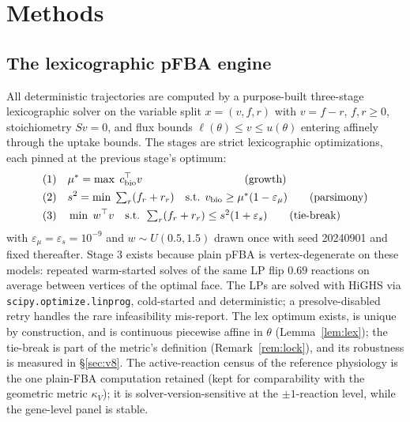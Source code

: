 \documentclass[11pt,a4paper]{article}
\theoremstyle{plain}
\theoremstyle{definition}
\theoremstyle{remark}
\newcommand{\kk}{\kappa_{\!V}}
\begin{document}
\section{Methods}\label{sec:methods}


\subsection{The lexicographic pFBA engine}\label{sec:engine}

All deterministic trajectories are computed by a purpose-built
three-stage lexicographic solver on the variable split $x = (v, f,
r)$ with $v = f - r$, $f, r \ge 0$, stoichiometry $Sv = 0$, and
flux bounds $\ell(\theta) \le v \le u(\theta)$ entering affinely
through the uptake bounds. The stages are strict lexicographic
optimizations, each pinned at the previous stage's optimum:
\begin{align}
\text{(1)}\quad & \mu^* = \max\; c_{\mathrm{bio}}^\top v
  \qquad\qquad\qquad\qquad\quad\; \text{(growth)} \notag\\
\text{(2)}\quad & s^2 = \min\; \textstyle\sum_r (f_r + r_r)
  \quad\text{s.t. } v_{\mathrm{bio}} \ge \mu^*(1 - \varepsilon_\mu)
  \qquad \text{(parsimony)} \notag\\
\text{(3)}\quad & \min\; w^\top v
  \quad\text{s.t. } \textstyle\sum_r (f_r + r_r) \le s^2(1 +
  \varepsilon_s) \qquad \text{(tie-break)} \notag
\end{align}
with $\varepsilon_\mu = \varepsilon_s = 10^{-9}$ and $w \sim U(0.5, 1.5)$ drawn once with seed 20240901 and fixed thereafter.
Stage 3 exists because plain pFBA is vertex-degenerate on these
models: repeated warm-started solves of the same LP flip $0.69$
reactions on average between vertices of the optimal face. The LPs
are solved with HiGHS
\citep{huangfu2018} via \texttt{scipy.optimize.linprog}, cold-started
and deterministic; a presolve-disabled retry handles the rare
infeasibility mis-report. The lex optimum exists, is unique by
construction, and is continuous piecewise affine in $\theta$
(Lemma~\ref{lem:lex}); the tie-break is part of the metric's
definition (Remark~\ref{rem:lock}), and its robustness is measured in \S\ref{sec:v8}. The active-reaction census of the reference physiology is the one plain-FBA computation retained (kept for comparability with the geometric metric $\kk$); it is solver-version-sensitive at the $\pm 1$-reaction
level, while the gene-level panel is stable.
\end{document}
